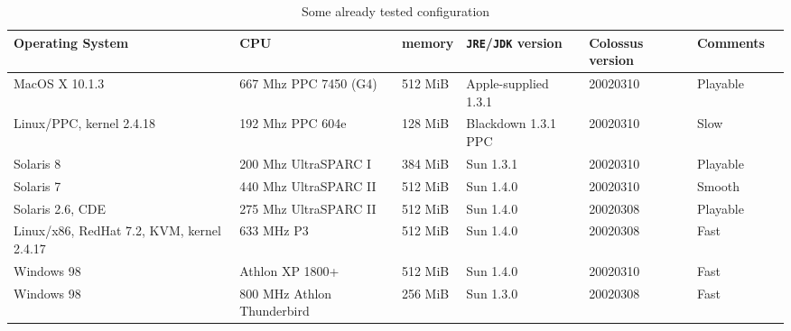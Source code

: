 \documentclass{article}
\begin{document}
\begin{table}
\begin{tabular}{|p{2.5cm}|p{2.5cm}|p{1.8cm}|p{2.5cm}|p{2.5cm}|p{1.8cm}|p{1.8cm}|}

\hline

\textbf{Operating System} & \textbf{CPU} & \textbf{memory} &  \textbf{\texttt{JRE}/\texttt{JDK} version} & \textbf{Colossus version} & \textbf{Comments}\\

\hline

MacOS X 10.1.3 & 667 Mhz PPC 7450 (G4) & 512 MiB & Apple-supplied 1.3.1 & 20020310 & Playable \\

\hline

Linux/PPC, kernel 2.4.18 & 192 Mhz PPC 604e & 128 MiB & Blackdown 1.3.1 PPC & 20020310 & Slow \\

\hline

Solaris 8 & 200 Mhz UltraSPARC I & 384 MiB & Sun 1.3.1 & 20020310 & Playable \\

\hline

Solaris 7 & 440 Mhz UltraSPARC II & 512 MiB & Sun 1.4.0 & 20020310 & Smooth \\

\hline

Solaris 2.6, CDE & 275 Mhz UltraSPARC II & 512 MiB & Sun 1.4.0 & 20020308 & Playable \\

\hline

Linux/x86, RedHat 7.2, KVM, kernel 2.4.17 & 633 MHz P3 & 512 MiB & Sun 1.4.0 & 20020308 & Fast \\

\hline

Windows 98 & Athlon XP 1800+ & 512 MiB & Sun 1.4.0 & 20020310 & Fast \\

\hline

Windows 98 & 800 MHz Athlon Thunderbird & 256 MiB & Sun 1.3.0 & 20020308 & Fast \\

\hline

\end{tabular}
\caption{Some already tested configuration}
\label{TESTED}
\end{table}



\end{document}
